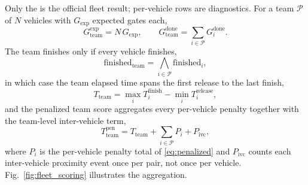 Only the  is the official fleet result; per-vehicle rows are diagnostics. For a team $\mathcal{P}$ of $N$ vehicles with $G_{\mathrm{exp}}$ expected gates each,
\begin{equation}
\label{eq:team_gates}
G_{\mathrm{team}}^{\mathrm{exp}}=N\,G_{\mathrm{exp}},\qquad
G_{\mathrm{team}}^{\mathrm{done}}=\sum_{i\in\mathcal{P}} G_i^{\mathrm{done}}.
\end{equation}
The team finishes only if every vehicle finishes,
\begin{equation}
\label{eq:team_finished}
\mathrm{finished}_{\mathrm{team}}=\bigwedge_{i\in\mathcal{P}}\mathrm{finished}_i,
\end{equation}
in which case the team elapsed time spans the first release to the last finish,
\begin{equation}
\label{eq:team_time}
T_{\mathrm{team}}=\max_{i} T_i^{\mathrm{finish}}-\min_{i} T_i^{\mathrm{release}},
\end{equation}
and the penalized team score aggregates every per-vehicle penalty together with the team-level inter-vehicle term,
\begin{equation}
\label{eq:team_pen}
T_{\mathrm{team}}^{\mathrm{pen}}=T_{\mathrm{team}}+\sum_{i\in\mathcal{P}} P_i+P_{\mathrm{ivc}},
\end{equation}
where $P_i$ is the per-vehicle penalty total of \eqref{eq:penalized} and $P_{\mathrm{ivc}}$ counts each inter-vehicle proximity event once per pair, not once per vehicle. Fig.~\ref{fig:fleet_scoring} illustrates the aggregation.


